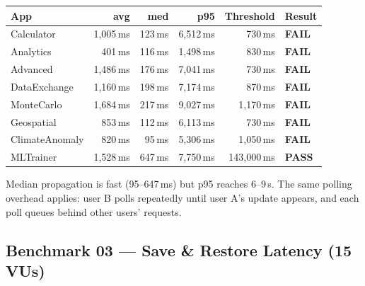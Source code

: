 \documentclass[11pt,a4paper]{article}
\begin{document}
\begin{center}
\begin{tabular}{lrrrrl}
\toprule
\textbf{App} & \textbf{avg} & \textbf{med} & \textbf{p95} & \textbf{Threshold} & \textbf{Result} \\
\midrule
Calculator     &  1,005\,ms &    123\,ms &  6,512\,ms &    730\,ms & \textbf{FAIL} \\
Analytics      &    401\,ms &    116\,ms &  1,498\,ms &    830\,ms & \textbf{FAIL} \\
Advanced       &  1,486\,ms &    176\,ms &  7,041\,ms &    730\,ms & \textbf{FAIL} \\
DataExchange   &  1,160\,ms &    198\,ms &  7,174\,ms &    870\,ms & \textbf{FAIL} \\
MonteCarlo     &  1,684\,ms &    217\,ms &  9,027\,ms &  1,170\,ms & \textbf{FAIL} \\
Geospatial     &    853\,ms &    112\,ms &  6,113\,ms &    730\,ms & \textbf{FAIL} \\
ClimateAnomaly &    820\,ms &     95\,ms &  5,306\,ms &  1,050\,ms & \textbf{FAIL} \\
MLTrainer      &  1,528\,ms &    647\,ms &  7,750\,ms & 143,000\,ms & \textbf{PASS} \\
\bottomrule
\end{tabular}
\end{center}

\noindent Median propagation is fast (95--647\,ms) but p95 reaches
6--9\,s. The same polling overhead applies: user B polls repeatedly
until user A's update appears, and each poll queues behind other
users' requests.

\subsection{Benchmark 03 — Save \& Restore Latency (15 VUs)}
\end{document}
